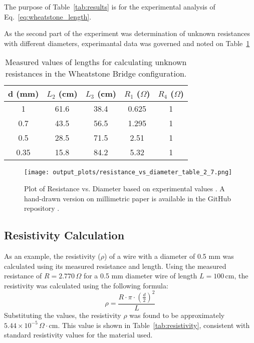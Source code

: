 \documentclass[journal]{IEEEtran}
\begin{document}
The purpose of Table~\ref{tab:results} is for the experimental analysis of Eq.~\ref{eq:wheatstone_length}.

As the second part of the experiment was determination of unknown resistances 
with different diameters, experimantal data was governed and noted on Table~\ref{tab:results_part2}

\begin{table}[H]
    \centering
    \begin{tabular}{ccccc}
    \hline
    d (mm) & $L_2$ (cm) & $L_3$ (cm) & $R_1$ ($\Omega$) & $R_4$ ($\Omega$) \\
    \hline
    1 & 61.6 & 38.4 & 0.625 & 1\\
    0.7 & 43.5 & 56.5 & 1.295 & 1\\
    0.5 & 28.5 & 71.5 & 2.51 & 1\\
    0.35 & 15.8 & 84.2 & 5.32 & 1\\
    \hline
    \end{tabular}
    \caption{Measured values of lengths for calculating unknown resistances in the Wheatstone Bridge configuration.}
    \label{tab:results_part2}
\end{table}

\begin{figure}[H]
    \centering
    \texttt{[image: output\_plots/resistance\_vs\_diameter\_table\_2\_7.png]} %
    \caption{Plot of Resistance vs. Diameter based on experimental values \cite{lab_manual}. A hand-drawn version on millimetric paper is available in the GitHub repository \cite{graphonmillimetricpaper}.}
    \label{fig:resistance_vs_diameter}
\end{figure}


\subsection{Resistivity Calculation}
As an example, the resistivity (\(\rho\)) of a wire with a diameter of 0.5 mm was calculated using its measured resistance and length. Using the measured resistance of \( R = 2.770 \, \Omega \) for a 0.5 mm diameter wire of length \( L = 100 \, \text{cm} \), the resistivity was calculated using the following formula:
\[
\rho = \frac{R \cdot \pi \cdot \left(\frac{d}{2}\right)^2}{L}
\]
Substituting the values, the resistivity \(\rho\) was found to be approximately \(5.44 \times 10^{-5} \, \Omega \cdot \text{cm}\). This value is shown in Table~\ref{tab:resistivity}, consistent with standard resistivity values for the material used.
\end{document}
